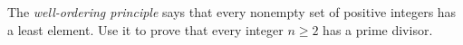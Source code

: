 The \emph{well-ordering principle} says that every nonempty set of positive integers has a least element. Use it to prove that every integer $n\ge2$ has a prime divisor.

